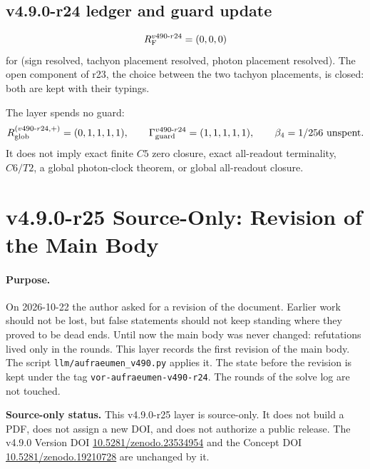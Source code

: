 \subsection*{v4.9.0-r24 ledger and guard update}
\label{subsec:v490-r24-ledger-guard}

\[
R_{\rm F}^{v490\text{-}r24}=(0,0,0)
\]
for (sign resolved, tachyon placement resolved, photon placement resolved).  The open component of r23, the choice between the
two tachyon placements, is closed: both are kept with their typings.

The layer spends no guard:
\[
R_{\rm glob}^{(v490\text{-}r24,+)}=(0,1,1,1,1),
\qquad
\Gamma_{\rm guard}^{v490\text{-}r24}=(1,1,1,1,1),
\qquad
\beta_4=1/256\ \text{unspent}.
\]
It does not imply exact finite \(C5\) zero closure, exact all-readout terminality,
\(C6/T2\), a global photon-clock theorem, or global all-readout closure.

\clearpage
\section*{v4.9.0-r25 Source-Only: Revision of the Main Body}
\label{sec:v490-r25-main-body-revision}

\paragraph{Purpose.}
On 2026-10-22 the author asked for a revision of the document.  Earlier work should not be lost, but false statements
should not keep standing where they proved to be dead ends.  Until now the main body was never changed: refutations
lived only in the rounds.  This layer records the first revision of the main body.  The script
\texttt{llm/aufraeumen\_v490.py} applies it.  The state before the revision is kept under the tag
\texttt{vor-aufraeumen-v490-r24}.  The rounds of the solve log are not touched.

\noindent\textbf{Source-only status.}
This v4.9.0-r25 layer is source-only.  It does not build a PDF, does not assign a new DOI,
and does not authorize a public release.  The v4.9.0 Version DOI
\href{https://doi.org/10.5281/zenodo.23534954}{10.5281/zenodo.23534954} and the Concept DOI
\href{https://doi.org/10.5281/zenodo.19210728}{10.5281/zenodo.19210728} are unchanged by it.

